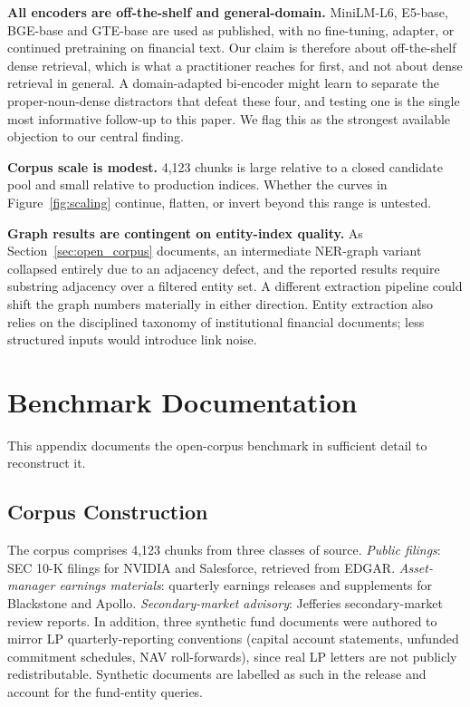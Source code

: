 \documentclass[runningheads]{llncs}
\begin{document}
\textbf{All encoders are off-the-shelf and general-domain.} MiniLM-L6, E5-base, BGE-base and GTE-base are used as published, with no fine-tuning, adapter, or continued pretraining on financial text. Our claim is therefore about off-the-shelf dense retrieval, which is what a practitioner reaches for first, and not about dense retrieval in general. A domain-adapted bi-encoder might learn to separate the proper-noun-dense distractors that defeat these four, and testing one is the single most informative follow-up to this paper. We flag this as the strongest available objection to our central finding.

\textbf{Corpus scale is modest.} 4{,}123 chunks is large relative to a closed candidate pool and small relative to production indices. Whether the curves in Figure~\ref{fig:scaling} continue, flatten, or invert beyond this range is untested.

\textbf{Graph results are contingent on entity-index quality.} As Section~\ref{sec:open_corpus} documents, an intermediate NER-graph variant collapsed entirely due to an adjacency defect, and the reported results require substring adjacency over a filtered entity set. A different extraction pipeline could shift the graph numbers materially in either direction. Entity extraction also relies on the disciplined taxonomy of institutional financial documents; less structured inputs would introduce link noise.



\appendix

\section{Benchmark Documentation}
\label{sec:appendix_bench}

This appendix documents the open-corpus benchmark in sufficient detail to reconstruct it.

\subsection{Corpus Construction}

The corpus comprises 4{,}123 chunks from three classes of source. \emph{Public filings}: SEC 10-K filings for NVIDIA and Salesforce, retrieved from EDGAR. \emph{Asset-manager earnings materials}: quarterly earnings releases and supplements for Blackstone and Apollo. \emph{Secondary-market advisory}: Jefferies secondary-market review reports. In addition, three synthetic fund documents were authored to mirror LP quarterly-reporting conventions (capital account statements, unfunded commitment schedules, NAV roll-forwards), since real LP letters are not publicly redistributable. Synthetic documents are labelled as such in the release and account for the fund-entity queries.
\end{document}
